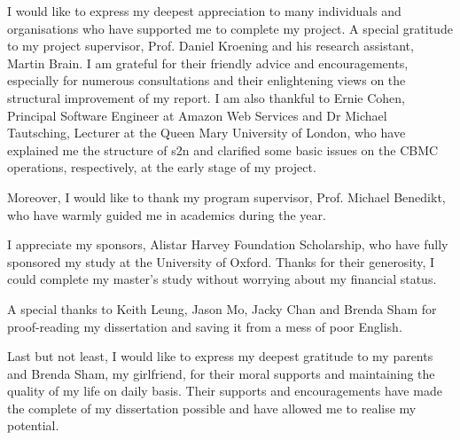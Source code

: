 \begin{acknowledgements}
I would like to express my deepest appreciation to many individuals and organisations who have supported me to complete my project. A special gratitude to my project supervisor, Prof. Daniel Kroening and his research assistant, Martin Brain. I am grateful for their friendly advice and encouragements, especially for numerous consultations and their enlightening views on the structural improvement of my report. I am also thankful to Ernie Cohen, Principal Software Engineer at Amazon Web Services and Dr Michael Tautsching, Lecturer at the Queen Mary University of London, who have explained me the structure of s2n and clarified some basic issues on the CBMC operations, respectively, at the early stage of my project.

Moreover, I would like to thank my program supervisor, Prof. Michael Benedikt, who have warmly guided me in academics during the year.

I appreciate my sponsors, Alistar Harvey Foundation Scholarship, who have fully sponsored my study at the University of Oxford. Thanks for their generosity, I could complete my master's study without worrying about my financial status. 

A special thanks to Keith Leung, Jason Mo, Jacky Chan and Brenda Sham for proof-reading my dissertation and saving it from a mess of poor English.

Last but not least, I would like to express my deepest gratitude to my parents and Brenda Sham, my girlfriend, for their moral supports and maintaining the quality of my life on daily basis. Their supports and encouragements have made the complete of my dissertation possible and have allowed me to realise my potential.
\end{acknowledgements}